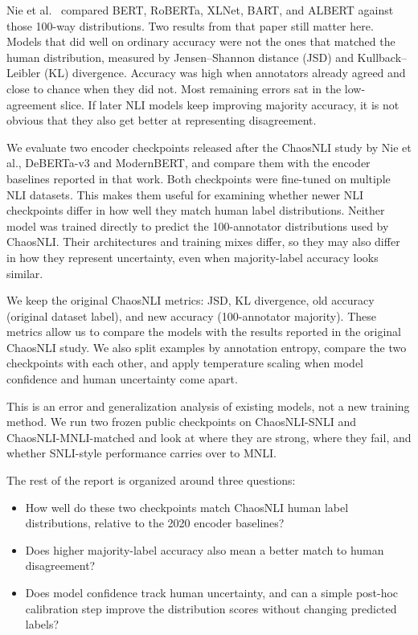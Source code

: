 \documentclass[11pt,a4paper]{article}
\begin{document}
Nie et al.\ \cite{nie2020chaosnli} compared BERT, RoBERTa, XLNet, BART, and ALBERT against those 100-way distributions. Two results from that paper still matter here. Models that did well on ordinary accuracy were not the ones that matched the human distribution, measured by Jensen--Shannon distance (JSD) and Kullback--Leibler (KL) divergence. Accuracy was high when annotators already agreed and close to chance when they did not. Most remaining errors sat in the low-agreement slice. If later NLI models keep improving majority accuracy, it is not obvious that they also get better at representing disagreement.

We evaluate two encoder checkpoints released after the ChaosNLI study by Nie et al., DeBERTa-v3 and ModernBERT, and compare them with the encoder baselines reported in that work. Both checkpoints were fine-tuned on multiple NLI datasets. This makes them useful for examining whether newer NLI checkpoints differ in how well they match human label distributions. Neither model was trained directly to predict the 100-annotator distributions used by ChaosNLI. Their architectures and training mixes differ, so they may also differ in how they represent uncertainty, even when majority-label accuracy looks similar.

We keep the original ChaosNLI metrics: JSD, KL divergence, old accuracy (original dataset label), and new accuracy (100-annotator majority). These metrics allow us to compare the models with the results reported in the original ChaosNLI study. We also split examples by annotation entropy, compare the two checkpoints with each other, and apply temperature scaling when model confidence and human uncertainty come apart.

This is an error and generalization analysis of existing models, not a new training method. We run two frozen public checkpoints on ChaosNLI-SNLI and ChaosNLI-MNLI-matched and look at where they are strong, where they fail, and whether SNLI-style performance carries over to MNLI.

The rest of the report is organized around three questions:
\begin{itemize}[itemsep=0.4em, topsep=0.4em]
    \item How well do these two checkpoints match ChaosNLI human label distributions, relative to the 2020 encoder baselines?
    \item Does higher majority-label accuracy also mean a better match to human disagreement?
    \item Does model confidence track human uncertainty, and can a simple post-hoc calibration step improve the distribution scores without changing predicted labels?
\end{itemize}
\end{document}
